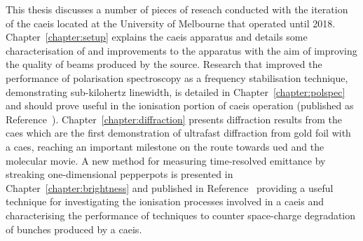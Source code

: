 This thesis discusses a number of pieces of reseach conducted with the iteration of the \gls{caeis} located at the University of Melbourne that operated until 2018.
Chapter~\ref{chapter:setup} explains the \gls{caeis} apparatus and details some characterisation of and improvements to the apparatus with the aim of improving the quality of beams produced by the source.
Research that improved the performance of polarisation spectroscopy as a frequency stabilisation technique, demonstrating sub-kilohertz linewidth, is detailed in Chapter~\ref{chapter:polspec} and should prove useful in the ionisation portion of \gls{caeis} operation (published as Reference~\cite{torrance_sub-kilohertz_2016}).
Chapter~\ref{chapter:diffraction} presents diffraction results from the \gls{caes} which are the first demonstration of ultrafast diffraction from gold foil with a \gls{caes}, reaching an important milestone on the route towards \gls{ued} and the molecular movie.
A new method for measuring time-resolved emittance by streaking one-dimensional pepperpots is presented in Chapter~\ref{chapter:brightness} and published in Reference~\cite{torrance_time-resolved_2018} providing a useful technique for investigating the ionisation processes involved in a \gls{caeis} and characterising the performance of techniques to counter space-charge degradation of bunches produced by a \gls{caeis}.
